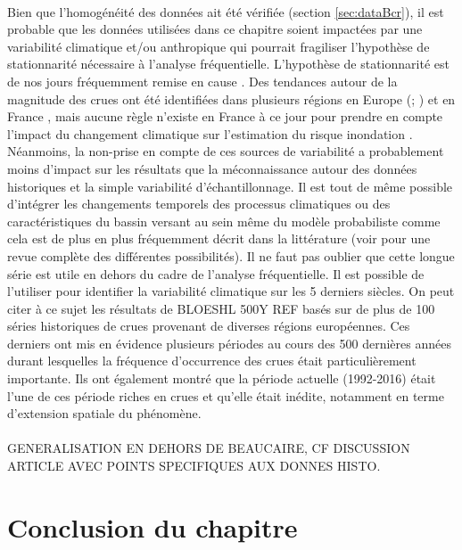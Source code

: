 \documentclass[11pt]{article}
\begin{document}
	\paragraph{} Bien que l'homogénéité des données ait été vérifiée (section \ref{sec:dataBcr}), il est probable que les données utilisées dans ce chapitre soient impactées par une variabilité climatique et/ou anthropique qui pourrait fragiliser l'hypothèse de stationnarité nécessaire à l'analyse fréquentielle. L'hypothèse de stationnarité est de nos jours fréquemment remise en cause \citep{milly_stationarity_2008}. Des tendances autour de la magnitude des crues ont été identifiées dans plusieurs régions en Europe (\citet{hall_understanding_2014}; \citet{bloschl_changing_2019}) et en France \citet{giuntoli_floods_2019}, mais aucune règle n'existe en France à ce jour pour prendre en compte l'impact du changement climatique sur l'estimation du risque inondation \citet{madsen_review_2014}. Néanmoins, la non-prise en compte de ces sources de variabilité a probablement moins d'impact sur les résultats que la méconnaissance autour des données historiques et la simple variabilité d'échantillonnage. Il est tout de même possible d'intégrer les changements temporels des processus climatiques ou des caractéristiques du bassin versant au sein même du modèle probabiliste comme cela est de plus en plus fréquemment décrit dans la littérature (voir \citet{salas_techniques_2018} pour une revue complète des différentes possibilités). Il ne faut pas oublier que cette longue série est utile en dehors du cadre de l'analyse fréquentielle. Il est possible de l'utiliser pour identifier la variabilité climatique sur les 5 derniers siècles. On peut citer à ce sujet les résultats de BLOESHL 500Y REF basés sur de plus de 100 séries historiques de crues provenant de diverses régions européennes. Ces derniers ont mis en évidence plusieurs périodes au cours des 500 dernières années durant lesquelles la fréquence d'occurrence des crues était particulièrement importante. Ils ont également montré que la période actuelle (1992-2016) était l'une de ces période riches en crues et qu'elle était inédite, notamment en terme d'extension spatiale du phénomène.
	
	
	\paragraph{} GENERALISATION EN DEHORS DE BEAUCAIRE, CF DISCUSSION ARTICLE AVEC POINTS SPECIFIQUES AUX DONNES HISTO.
	
\section{Conclusion du chapitre}
\label{sec:Conclu}
\end{document}
